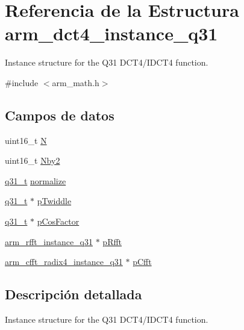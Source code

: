 \hypertarget{structarm__dct4__instance__q31}{}\section{Referencia de la Estructura arm\+\_\+dct4\+\_\+instance\+\_\+q31}
\label{structarm__dct4__instance__q31}


Instance structure for the Q31 D\+C\+T4/\+I\+D\+C\+T4 function.  




{\ttfamily \#include $<$arm\+\_\+math.\+h$>$}

\subsection*{Campos de datos}
\begin{DoxyCompactItemize}
\item 
uint16\+\_\+t \hyperlink{structarm__dct4__instance__q31_a37d49571fe35012087153c093705cd11}{N}
\item 
uint16\+\_\+t \hyperlink{structarm__dct4__instance__q31_afa64b1618089e35c2b55cff71cb29715}{Nby2}
\item 
\hyperlink{arm__math_8h_adc89a3547f5324b7b3b95adec3806bc0}{q31\+\_\+t} \hyperlink{structarm__dct4__instance__q31_a3a2f571658a202a38fa508098001b47c}{normalize}
\item 
\hyperlink{arm__math_8h_adc89a3547f5324b7b3b95adec3806bc0}{q31\+\_\+t} $\ast$ \hyperlink{structarm__dct4__instance__q31_a2505b7d5ec077b244c712797a5253b6d}{p\+Twiddle}
\item 
\hyperlink{arm__math_8h_adc89a3547f5324b7b3b95adec3806bc0}{q31\+\_\+t} $\ast$ \hyperlink{structarm__dct4__instance__q31_af06acf18dc6547fc29aba2eb68cc63f0}{p\+Cos\+Factor}
\item 
\hyperlink{structarm__rfft__instance__q31}{arm\+\_\+rfft\+\_\+instance\+\_\+q31} $\ast$ \hyperlink{structarm__dct4__instance__q31_a16c74f8496e1691e62da3c57e0c676eb}{p\+Rfft}
\item 
\hyperlink{structarm__cfft__radix4__instance__q31}{arm\+\_\+cfft\+\_\+radix4\+\_\+instance\+\_\+q31} $\ast$ \hyperlink{structarm__dct4__instance__q31_a0b1f4a05c1824bab3b9bd837a260232a}{p\+Cfft}
\end{DoxyCompactItemize}


\subsection{Descripción detallada}
Instance structure for the Q31 D\+C\+T4/\+I\+D\+C\+T4 function. 


